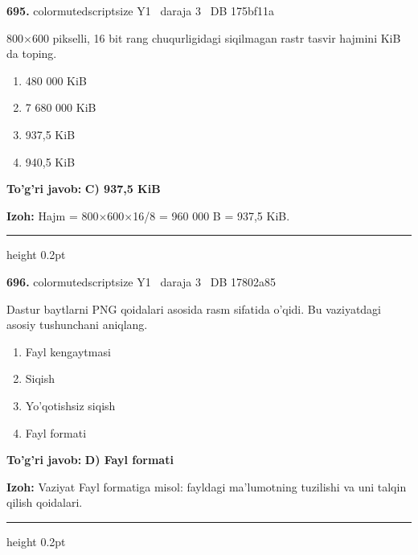 \documentclass[10pt,a4paper,oneside]{article}
\begin{document}
\noindent\textbf{\color{ink}695.}  {color{muted}scriptsize Y1 \textbullet\ daraja 3 \textbullet\ DB 175bf11a}
\par
800\ensuremath{\times}600 pikselli, 16 bit rang chuqurligidagi siqilmagan rastr tasvir hajmini KiB da toping.
\begin{enumerate}[label=\Alph*),leftmargin=9mm]
\item 480 000 KiB
\item 7 680 000 KiB
\item 937,5 KiB
\item 940,5 KiB
\end{enumerate}
\begin{tcolorbox}[enhanced,breakable,colback=teal!4,colframe=teal!50!black,boxrule=0.5pt,arc=1.1mm,left=3mm,right=3mm,top=1.7mm,bottom=1.7mm,before skip=2mm,after skip=2mm]
\textbf{\color{teal}To'g'ri javob:} \textbf{C) 937,5 KiB}
\par\smallskip
\textbf{Izoh:} Hajm = 800\ensuremath{\times}600\ensuremath{\times}16/8 = 960 000 B = 937,5 KiB.
\end{tcolorbox}
\vspace{2mm}\hrule height 0.2pt \vspace{3mm}

\noindent\textbf{\color{ink}696.}  {color{muted}scriptsize Y1 \textbullet\ daraja 3 \textbullet\ DB 17802a85}
\par
Dastur baytlarni PNG qoidalari asosida rasm sifatida o'qidi. Bu vaziyatdagi asosiy tushunchani aniqlang.
\begin{enumerate}[label=\Alph*),leftmargin=9mm]
\item Fayl kengaytmasi
\item Siqish
\item Yo'qotishsiz siqish
\item Fayl formati
\end{enumerate}
\begin{tcolorbox}[enhanced,breakable,colback=teal!4,colframe=teal!50!black,boxrule=0.5pt,arc=1.1mm,left=3mm,right=3mm,top=1.7mm,bottom=1.7mm,before skip=2mm,after skip=2mm]
\textbf{\color{teal}To'g'ri javob:} \textbf{D) Fayl formati}
\par\smallskip
\textbf{Izoh:} Vaziyat Fayl formatiga misol: fayldagi ma'lumotning tuzilishi va uni talqin qilish qoidalari.
\end{tcolorbox}
\vspace{2mm}\hrule height 0.2pt \vspace{3mm}
\end{document}
